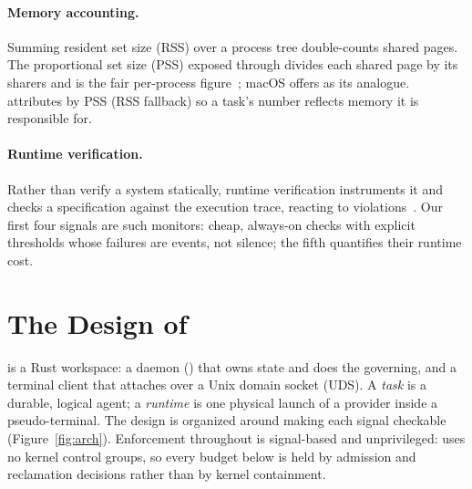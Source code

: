 \paragraph{Memory accounting.} Summing resident set size (RSS) over a process tree double-counts
shared pages. The proportional set size (PSS) exposed through 
divides each shared page by its sharers and is the fair per-process figure~\citep{procfs}; macOS
offers  as its analogue. \sys{} attributes by PSS (RSS fallback) so a task's
number reflects memory it is responsible for.

\paragraph{Runtime verification.} Rather than verify a system statically, runtime verification
instruments it and checks a specification against the execution trace, reacting to
violations~\citep{bartocci2018introrv}. Our first four signals are such monitors: cheap, always-on
checks with explicit thresholds whose failures are events, not silence; the fifth quantifies their
runtime cost.

\section{The Design of \sys{}}
\label{sec:design}

\sys{} is a Rust workspace: a daemon () that owns state and does the governing, and a
terminal client that attaches over a Unix domain socket (UDS). A \emph{task} is a durable, logical agent;
a \emph{runtime} is one physical launch of a provider inside a pseudo-terminal. The design is
organized around making each signal checkable (Figure~\ref{fig:arch}). Enforcement throughout is
signal-based and unprivileged: \sys{} uses no kernel control groups, so every budget below is held by
admission and reclamation decisions rather than by kernel containment.

